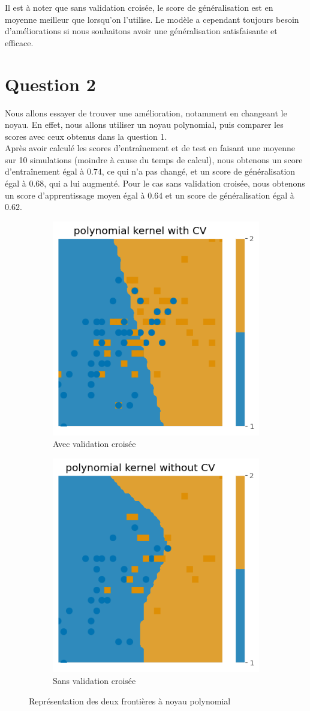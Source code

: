 \documentclass{article}
\begin{document}
Il est à noter que sans validation croisée, le score de généralisation est en moyenne meilleur que lorsqu'on l'utilise. Le modèle a cependant toujours besoin d'améliorations si nous souhaitons avoir une généralisation satisfaisante et efficace.

\section{Question 2}

Nous allons essayer de trouver une amélioration, notamment en changeant le noyau. En effet, nous allons utiliser un noyau polynomial, puis comparer les scores avec ceux obtenus dans la question 1.\\
Après avoir calculé les scores d'entraînement et de test en faisant une moyenne sur 10 simulations (moindre à cause du temps de calcul), nous obtenons un score d'entraînement égal à $0.74$, ce qui n'a pas changé, et un score de généralisation égal à $0.68$, qui a lui augmenté. Pour le cas sans validation croisée, nous obtenons un score d'apprentissage moyen égal à $0.64$ et un score de généralisation égal à $0.62$.

\begin{figure}[H]
    \centering
\begin{subfigure}{0.45\linewidth}
    \centering
    \includegraphics[width=0.5\linewidth]{outputs/q2_CV.png}
    \caption{Avec validation croisée}
    \label{fig:q2_CV}
\end{subfigure}
\begin{subfigure}{0.45\linewidth}
    \centering
    \includegraphics[width=0.5\linewidth]{outputs/q2_noCV.png}
    \caption{Sans validation croisée}
    \label{fig:q2_noCV}
\end{subfigure}
\caption{Représentation des deux frontières à noyau polynomial}

\end{figure}
\end{document}
